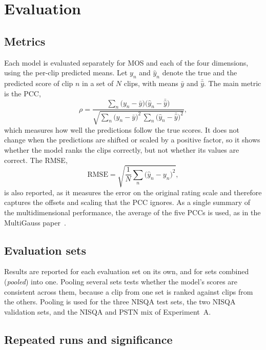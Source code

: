 \documentclass[
english,                 %
bibtex,                  %
includeExtraAbstracts, %
]{kththesis}
\numberwithin{listing}{chapter}
\begin{document}
\section{Evaluation}
\label{sec:evaluation}

\subsection{Metrics}

Each model is evaluated separately for MOS and each of the four dimensions, using the per-clip predicted means. Let $y_n$ and $\hat{y}_n$ denote the true and the predicted score of clip $n$ in a set of $N$ clips, with means $\bar{y}$ and $\bar{\hat{y}}$. The main metric is the \gls{PCC},
\begin{equation}
  \rho = \frac{\sum_{n}\big(y_n - \bar{y}\big)\big(\hat{y}_n - \bar{\hat{y}}\big)}{\sqrt{\sum_{n}\big(y_n - \bar{y}\big)^2 \, \sum_{n}\big(\hat{y}_n - \bar{\hat{y}}\big)^2}},
  \label{eq:pcc}
\end{equation}
which measures how well the predictions follow the true scores. It does not change when the predictions are shifted or scaled by a positive factor, so it shows whether the model ranks the clips correctly, but not whether its values are correct. The \gls{RMSE},
\begin{equation}
  \mathrm{RMSE} = \sqrt{\frac{1}{N}\sum_{n}\big(\hat{y}_n - y_n\big)^2},
  \label{eq:rmse}
\end{equation}
is also reported, as it measures the error on the original rating scale and therefore captures the offsets and scaling that the \gls{PCC} ignores. As a single summary of the multidimensional performance, the average of the five PCCs is used, as in the MultiGauss paper~\cite{cumlin_multigauss_2025}.

\subsection{Evaluation sets}

Results are reported for each evaluation set on its own, and for sets combined (\emph{pooled}) into one. Pooling several sets tests whether the model's scores are consistent across them, because a clip from one set is ranked against clips from the others. Pooling is used for the three NISQA test sets, the two NISQA validation sets, and the NISQA and PSTN mix of Experiment~A.

\subsection{Repeated runs and significance}
\end{document}
